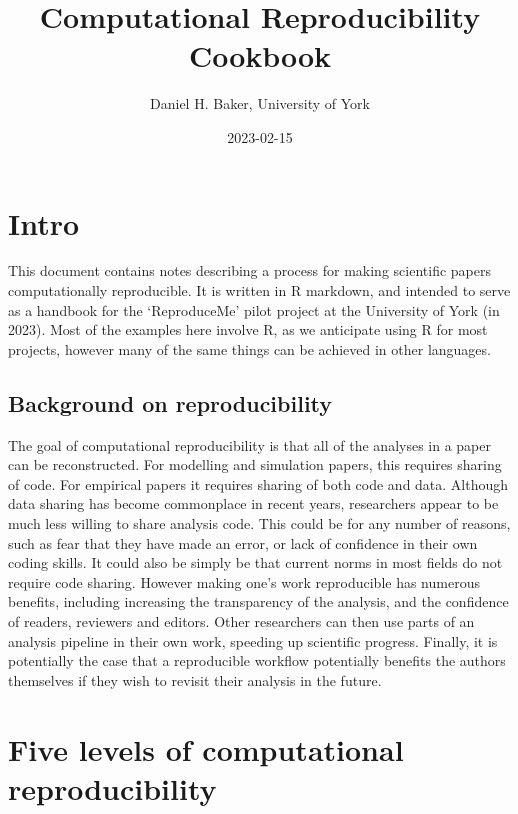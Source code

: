 \documentclass[
]{article}
\title{Computational Reproducibility Cookbook}
\author{Daniel H. Baker, University of York}
\date{2023-02-15}
\begin{document}
\maketitle

\hypertarget{intro}{%
\section{Intro}\label{intro}}

This document contains notes describing a process for making scientific papers computationally reproducible. It is written in R markdown, and intended to serve as a handbook for the `ReproduceMe' pilot project at the University of York (in 2023). Most of the examples here involve R, as we anticipate using R for most projects, however many of the same things can be achieved in other languages.

\hypertarget{background-on-reproducibility}{%
\subsection{Background on reproducibility}\label{background-on-reproducibility}}

The goal of computational reproducibility is that all of the analyses in a paper can be reconstructed. For modelling and simulation papers, this requires sharing of code. For empirical papers it requires sharing of both code and data. Although data sharing has become commonplace in recent years, researchers appear to be much less willing to share analysis code. This could be for any number of reasons, such as fear that they have made an error, or lack of confidence in their own coding skills. It could also be simply be that current norms in most fields do not require code sharing. However making one's work reproducible has numerous benefits, including increasing the transparency of the analysis, and the confidence of readers, reviewers and editors. Other researchers can then use parts of an analysis pipeline in their own work, speeding up scientific progress. Finally, it is potentially the case that a reproducible workflow potentially benefits the authors themselves if they wish to revisit their analysis in the future.

\hypertarget{five-levels-of-computational-reproducibility}{%
\section{Five levels of computational reproducibility}\label{five-levels-of-computational-reproducibility}}
\end{document}
